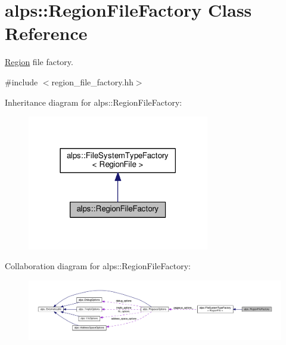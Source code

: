 \hypertarget{classalps_1_1RegionFileFactory}{}\section{alps\+:\+:Region\+File\+Factory Class Reference}
\label{classalps_1_1RegionFileFactory}


\hyperlink{classalps_1_1Region}{Region} file factory.  




{\ttfamily \#include $<$region\+\_\+file\+\_\+factory.\+hh$>$}



Inheritance diagram for alps\+:\+:Region\+File\+Factory\+:
\nopagebreak
\begin{figure}[H]
\begin{center}
\leavevmode
\includegraphics[width=225pt]{classalps_1_1RegionFileFactory__inherit__graph}
\end{center}
\end{figure}


Collaboration diagram for alps\+:\+:Region\+File\+Factory\+:
\nopagebreak
\begin{figure}[H]
\begin{center}
\leavevmode
\includegraphics[width=350pt]{classalps_1_1RegionFileFactory__coll__graph}
\end{center}
\end{figure}
